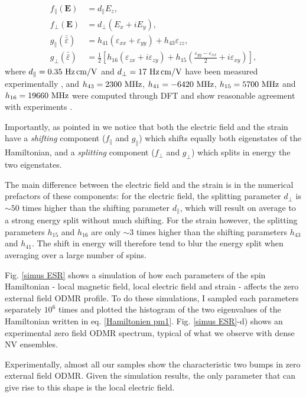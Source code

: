 \documentclass[a4paper,11pt]{report}
\begin{document}
\begin{refsection}
\begin{align}
f_\parallel(\mathbf{E})&=d_\parallel E_z, \\
f_\perp(\mathbf{E})&=d_\perp ( E_x + i E_y), \\
g_\parallel(\bar{\bar{\varepsilon}})&= h_{41}(\varepsilon_{xx}+\varepsilon_{yy})+h_{43} \varepsilon_{zz}, \\
g_\perp(\bar{\bar{\varepsilon}}) &= \frac{1}{2} \left[ h_{16}(\varepsilon_{zx}+i \varepsilon_{zy}) + h_{15}\left(\frac{\varepsilon_{yy}-\varepsilon_{xx}}{2}+i\varepsilon_{xy}\right) \right],
\end{align}
where $d_\parallel=0.35 \ \rm{Hz\, cm/V}$ and $d_\perp=17\ \rm{Hz\, cm/V}$ have been measured experimentally \citep{van1990electric}, and $h_{43}=2300\ \rm{MHz}$, $h_{41}=-6420\ \rm{MHz}$, $h_{15}=5700\ \rm{MHz}$ and $h_{16}=19660\ \rm{MHz}$ were computed through DFT \citep{udvarhelyi2018spin} and show reasonable agreement with experiments \citep{barson2017nanomechanical}.

Importantly, as pointed in \citep{mittiga2018imaging} we notice that both the electric field and the strain have a \textit{shifting} component ($f_\parallel$ and $g_\parallel$) which shifts equally both eigenstates of the Hamiltonian, and a \textit{splitting} component ($f_\perp$ and $g_\perp$) which splits in energy the two eigenstates. 

The main difference between the electric field and the strain is in the numerical prefactors of these components: for the electric field, the splitting parameter $d_\perp$ is $\sim 50$ times higher than the shifting parameter $d_\parallel$, which will result on average to a strong energy split without much shifting. For the strain however, the splitting parameters $h_{15}$ and $h_{16}$ are only $\sim 3$ times higher than the shifting parameters $h_{43}$ and $h_{41}$. The shift in energy will therefore tend to blur the energy split when averaging over a large number of spins.

Fig. \ref{simus ESR} shows a simulation of how each parameters of the spin Hamiltonian - local magnetic field, local electric field and strain - affects the zero external field ODMR profile. To do these simulations, I sampled each parameters separately $10^6$ times and plotted the histogram of the two eigenvalues of the Hamiltonian written in eq. \ref{Hamiltonien pm1}. Fig. \ref{simus ESR}-d) shows an experimental zero field ODMR spectrum, typical of what we observe with dense NV ensembles. 

Experimentally, almost all our samples show the characteristic two bumps in zero external field ODMR. Given the simulation results, the only parameter that can give rise to this shape is the local electric field. 


\end{refsection}
\end{document}
